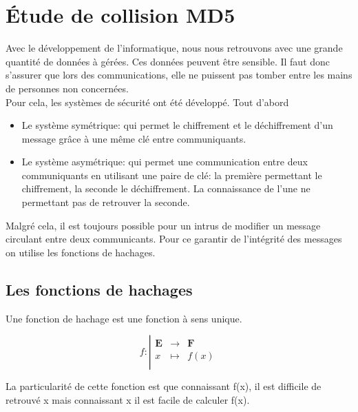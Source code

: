 \documentclass[a4paper,11pt,french]{article}
\begin{document}
\newpage
\section{\'Etude de collision MD5}

Avec le développement de l'informatique, nous nous retrouvons avec une grande quantité de données à gérées. Ces données peuvent \^etre sensible. Il faut donc s'assurer que lors des communications, elle ne puissent pas tomber entre les mains de personnes non concernées.\\

Pour cela, les systèmes de sécurité ont été développé. Tout d'abord \begin{itemize}
\item Le système symétrique: qui permet le chiffrement et le déchiffrement d'un message gr\^ace à une m\^eme clé  entre communiquants.
\item Le système asymétrique: qui permet une communication entre deux communiquants en utilisant une paire de clé: la première permettant le chiffrement, la seconde le déchiffrement. La connaissance de l'une ne permettant pas de retrouver la seconde.
\end{itemize}
\vspace{.5cm}
Malgré cela, il est toujours possible pour un intrus de modifier un message circulant entre deux communicants. Pour ce garantir de l'intégrité des messages on utilise les fonctions de hachages.

\subsection{Les fonctions de hachages}
Une fonction de hachage est une fonction à sens unique.

\begin{displaymath}
f:
\left|
  \begin{array}{rcl}
    \mathbf{E} & \longrightarrow &\mathbf{F} \\
    x & \longmapsto & f(x) \\
  \end{array}
\right.
\end{displaymath}

La particularité de cette fonction est que connaissant f(x), il est difficile de retrouvé x mais connaissant x il est facile de calculer f(x).

\end{document}
